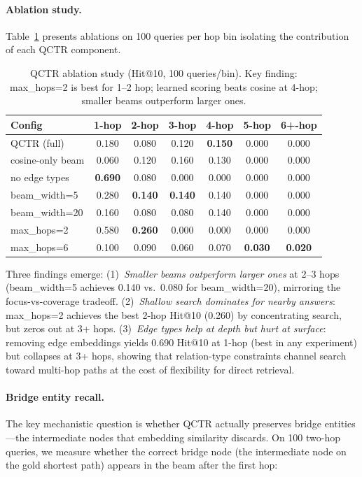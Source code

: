 \documentclass[11pt]{article}
\begin{document}
\paragraph{Ablation study.} Table~\ref{tab:qctr_ablations} presents ablations on 100 queries per hop bin isolating the contribution of each QCTR component.

\begin{table}[h]
\centering
\caption{QCTR ablation study (Hit@10, 100 queries/bin). Key finding: max\_hops=2 is best for 1--2 hop; learned scoring beats cosine at 4-hop; smaller beams outperform larger ones.}
\label{tab:qctr_ablations}
\begin{tabular}{l cccccc}
\toprule
Config & 1-hop & 2-hop & 3-hop & 4-hop & 5-hop & 6+-hop \\
\midrule
QCTR (full) & 0.180 & 0.080 & 0.120 & \textbf{0.150} & 0.000 & 0.000 \\
cosine-only beam & 0.060 & 0.120 & 0.160 & 0.130 & 0.000 & 0.000 \\
no edge types & \textbf{0.690} & 0.080 & 0.000 & 0.000 & 0.000 & 0.000 \\
beam\_width=5 & 0.280 & \textbf{0.140} & \textbf{0.140} & 0.140 & 0.000 & 0.000 \\
beam\_width=20 & 0.160 & 0.080 & 0.080 & 0.140 & 0.000 & 0.000 \\
max\_hops=2 & 0.580 & \textbf{0.260} & 0.000 & 0.000 & 0.000 & 0.000 \\
max\_hops=6 & 0.100 & 0.090 & 0.060 & 0.070 & \textbf{0.030} & \textbf{0.020} \\
\bottomrule
\end{tabular}
\end{table}

Three findings emerge: (1)~\textit{Smaller beams outperform larger ones} at 2--3 hops (beam\_width=5 achieves 0.140 vs.\ 0.080 for beam\_width=20), mirroring the focus-vs-coverage tradeoff. (2)~\textit{Shallow search dominates for nearby answers}: max\_hops=2 achieves the best 2-hop Hit@10 (0.260) by concentrating search, but zeros out at 3+ hops. (3)~\textit{Edge types help at depth but hurt at surface}: removing edge embeddings yields 0.690 Hit@10 at 1-hop (best in any experiment) but collapses at 3+ hops, showing that relation-type constraints channel search toward multi-hop paths at the cost of flexibility for direct retrieval.

\paragraph{Bridge entity recall.} The key mechanistic question is whether QCTR actually preserves bridge entities---the intermediate nodes that embedding similarity discards. On 100 two-hop queries, we measure whether the correct bridge node (the intermediate node on the gold shortest path) appears in the beam after the first hop:
\end{document}
